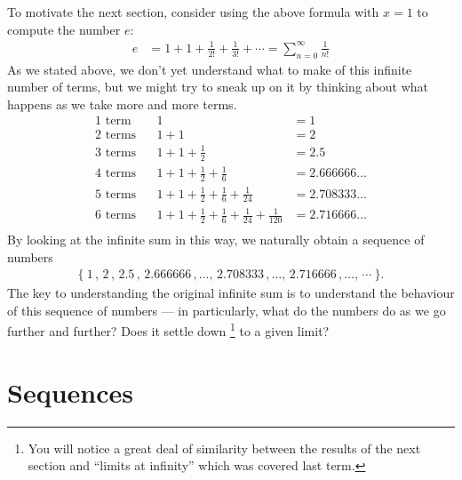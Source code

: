 To motivate the next section, consider using the above formula with $x=1$ to compute the number $e$:
\begin{align*}
  e &= 1 + 1  + \frac{1}{2!} + \frac{1}{3!} + \cdots = \sum_{n=0}^\infty\frac{1}{n!}
\end{align*}
As we stated above, we don't yet understand what to make of this infinite number of terms, but we might try to sneak up
on it by thinking about what happens as we take more and more terms.
\begin{align*}
  \text{1 term}\phantom{s} && 1&=1 \\
  \text{2 terms} && 1+1&=2 \\
  \text{3 terms} && 1+1+\frac{1}{2}&=2.5 \\
  \text{4 terms} && 1+1+\frac{1}{2}+\frac{1}{6}&=2.666666\dots \\
  \text{5 terms} && 1+1+\frac{1}{2}+\frac{1}{6} + \frac{1}{24}&=2.708333\dots \\
  \text{6 terms} && 1+1+\frac{1}{2}+\frac{1}{6} + \frac{1}{24} + \frac{1}{120}&=2.716666\dots \\
\end{align*}
By looking at the infinite sum in this way, we naturally obtain a
sequence of numbers
\begin{align*}
\{\ 1\,,\,2\,,\,2.5\,,\,2.666666\,,\dots,\,2.708333\,,\dots,\,
   2.716666\,,\dots,\,\cdots\ \}.
\end{align*}
The key to understanding the original infinite sum is to understand the behaviour of this sequence of numbers --- in
particularly, what do the numbers do as we go further and further? Does it settle down \footnote{You
will notice a great deal of similarity between the results of the next section and ``limits at infinity'' which was
covered last term.} to a given limit?



\section{Sequences}

